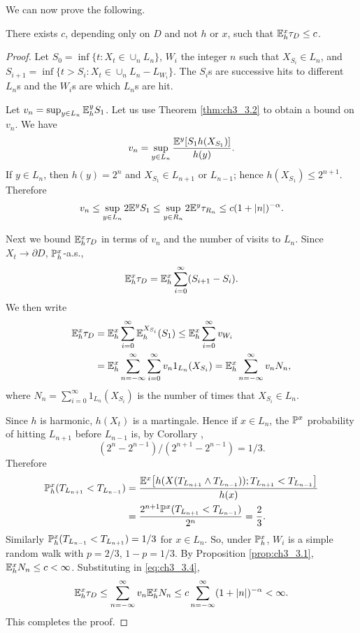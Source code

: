 We can now prove the following.


\begin{theorem}\label{thm:ch3_3.3}
There exists $c$, depending only on $D$ and not $h$ or $x$, such that $\E_h^x\tau_D \leq c$.
\end{theorem}

\begin{proof}
Let $S_0 = \inf\{t : X_t \in \cup_nL_n\}$, $W_i$ the integer $n$ such that $X_{S_i} \in L_n$, and $S_{i+1} = \inf\{t > S_i : X_t \in \cup_nL_n - L_{W_i}\}$. The $S_i$s are successive hits to different $L_n$s and the $W_i$s are which $L_n$s are hit.


Let $v_n = \sup_{y\in L_n} \E_h^yS_1$. Let us use Theorem \ref{thm:ch3_3.2} to obtain a bound on $v_n$. We have
\[
    v_n = \sup_{y\in L_n} \frac{\E^y[S_1h(X_{S_1})]}{h(y)}.
\]
If $y \in L_n$, then $h(y) = 2^n$ and $X_{S_1} \in L_{n+1}$ or $L_{n-1}$; hence $h(X_{S_1}) \leq 2^{n+1}$. Therefore
\[
    v_n \leq \sup_{y\in L_n} 2\E^yS_1 \leq \sup_{y\in R_n} 2\E^y\tau_{R_n} \leq c(1 + |n|)^{-\alpha}.
\]

Next we bound $\E_h^x\tau_D$ in terms of $v_n$ and the number of visits to $L_n$. Since $X_t \to \partial D$, $\P_h^x$-a.s.,
\[
    \E_h^x\tau_D = \E_h^x \sum_{i=0}^\infty (S_{i+1} - S_i).
\]
We then write
\begin{align}\label{eq:ch3_3.4}
    \E_h^x\tau_D &= \E_h^x \sum_{i=0}^\infty \E_h^{X_{S_i}}(S_1) \leq \E_h^x \sum_{i=0}^\infty v_{W_i} \\
    &= \E_h^x \sum_{n=-\infty}^\infty \sum_{i=0}^\infty v_n1_{L_n}(X_{S_i}) = \E_h^x \sum_{n=-\infty}^\infty v_nN_n, \notag
\end{align}
where $N_n = \sum_{i=0}^\infty 1_{L_n}(X_{S_i})$ is the number of times that $X_{S_i} \in L_n$.

Since $h$ is harmonic, $h(X_t)$ is a martingale. Hence if $x \in L_n$, the $\P^x$ probability of hitting $L_{n+1}$ before $L_{n-1}$ is, by Corollary ,
\[
    (2^n - 2^{n-1})/(2^{n+1} - 2^{n-1}) = 1/3.
\]
Therefore
\begin{align*}
    \P_h^x(T_{L_{n+1}} < T_{L_{n-1}}) &= \frac{\E^x\big[h(X(T_{L_{n+1}} \wedge T_{L_{n-1}})); T_{L_{n+1}} < T_{L_{n-1}}\big]}{h(x)} \\
    &= \frac{2^{n+1}\P^x(T_{L_{n+1}} < T_{L_{n-1}})}{2^n} = \frac{2}{3}.
\end{align*}
\mnewpage
Similarly $\P_h^x(T_{L_{n-1}} < T_{L_{n+1}}) = 1/3$ for $x \in L_n$. So, under $\P_h^x$, $W_i$ is a simple random walk with $p = 2/3$, $1-p = 1/3$. By Proposition \ref{prop:ch3_3.1}, $\E_h^xN_n \leq c < \infty$. Substituting in \eqref{eq:ch3_3.4},
\[
    \E_h^x\tau_D \leq \sum_{n=-\infty}^\infty v_n\E_h^xN_n \leq c \sum_{n=-\infty}^\infty (1 + |n|)^{-\alpha} < \infty.
\]
This completes the proof.
\end{proof}

